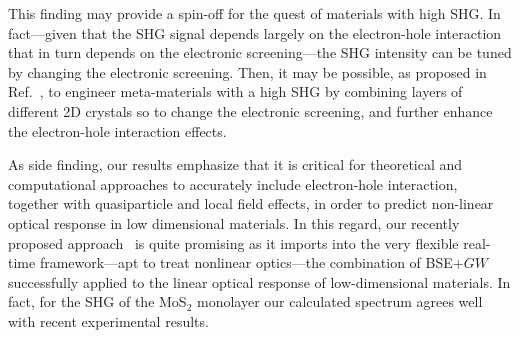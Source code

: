 This finding may provide a spin-off for the quest of materials with high SHG. In fact---given that the SHG signal depends largely on the electron-hole interaction that in turn depends on the electronic screening---the SHG intensity can be tuned by changing the electronic screening. Then, it may be possible, as proposed in Ref.~\cite{gao2012artificially}, to engineer meta-materials with a high SHG by combining layers of different 2D crystals\cite{gao2012artificially} so to change the electronic screening, and further enhance the electron-hole interaction effects.

As side finding, our results emphasize that it is critical for theoretical and computational approaches to accurately include electron-hole interaction, together with quasiparticle and local field effects, in order to predict non-linear optical response in low dimensional materials. In this regard, our recently proposed approach~\cite{nloptics2013,attaccalite} is quite promising as it imports into the very flexible real-time framework---apt to treat nonlinear optics---the combination of BSE+$GW$ successfully applied to the linear optical response of low-dimensional materials. In fact, for the SHG of the MoS$_2$ monolayer our calculated spectrum agrees well with recent experimental results.

